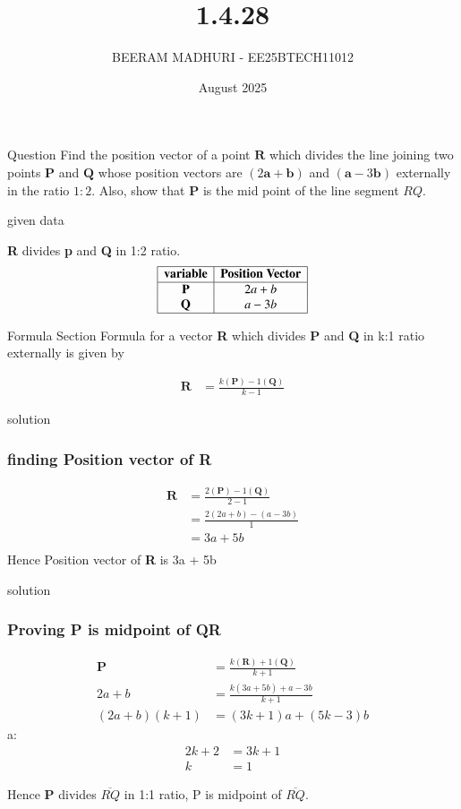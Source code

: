 \documentclass{beamer}
\title %
{1.4.28}
\date{August  2025}
\author %
{BEERAM MADHURI - EE25BTECH11012}
\begin{document}
\frame{\titlepage}
\begin{frame}{Question}
 Find the position vector of a point $\mathbf{R}$ which divides the line joining two points $\mathbf{P}$ and $\mathbf{Q}$ whose position vectors are $(2\mathbf{a} + \mathbf{b})$ and $(\mathbf{a} - 3\mathbf{b})$ externally in the ratio $1 : 2$. Also, show that $\mathbf{P}$ is the mid point of the line segment $RQ$.
 
 

\end{frame}
 
\begin{frame}{given data}
 
\text \textbf{R} divides \textbf{p} and \textbf{Q} in 1:2 ratio.
\[
\begin{array}{|c|c|c|c|}
\hline
\textbf{variable} & \textbf{Position Vector}\\
\hline
\textbf{P} & 2a+b\\
\textbf{Q} & a-3b\\
\hline
\end{array}
\]

   
\end{frame}

\begin{frame}{Formula}
Section Formula for a vector 
  \textbf{R} which divides \textbf{P} and \textbf{Q} in k:1 ratio externally is given by 

\begin{align*}
 \textbf{R} &= \frac{k(\textbf{P}) - 1(\textbf{Q})}{k - 1}
 \end{align*}
 \end{frame}
 

\begin{frame}{solution}
    \frametitle{finding Position vector of \textbf{R}}
\begin{align}
    \textbf{R} &= \frac{2(\textbf{P}) - 1(\textbf{Q})}{2 - 1} \\
&= \frac{2(2a+b) - (a-3b)}{1} \\
&= 3a + 5b\\
\end{align}
Hence Position vector of \textbf{R} is 3a + 5b
\end{frame}
\begin{frame}{solution}
    \frametitle{Proving \textbf{P} is midpoint of \textbf{QR}}
    \begin{align*}
\textbf{P} &= \frac{k(\textbf{R}) + 1(\textbf{Q})}{k+1} \\
2a+b &= \frac{k(3a+5b) + a-3b}{k+1} \\
(2a+b)(k+1) &= (3k+1)a + (5k-3)b
\end{align*}
 a:
\begin{align*}
2k+2 &= 3k+1 \\
k &= 1
\end{align*}

\text Hence \textbf{P} divides $\overline{RQ}$ in 1:1 ratio, P is midpoint of $\overline{RQ}$.

\end{frame}
\end{document}
